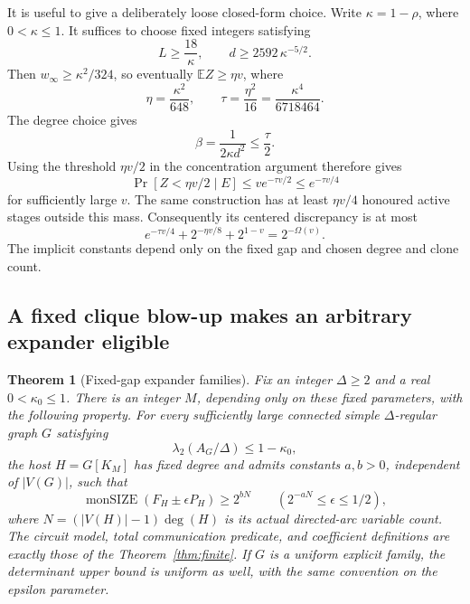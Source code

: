 \documentclass[11pt]{article}
\newtheorem{theorem}{Theorem}[section]
\theoremstyle{definition}
\theoremstyle{remark}
\numberwithin{equation}{section}
\begin{document}
It is useful to give a deliberately loose closed-form choice.
Write \(\kappa=1-\rho\), where \(0<\kappa\le1\). It suffices
to choose fixed integers satisfying
\begin{equation}\label{eq:G3}
L\ge\frac{18}{\kappa},\qquad
              d\ge2592\,\kappa^{-5/2}.
\end{equation}
Then \(w_\infty\ge\kappa^2/324\), so eventually
\(\mathbb E Z\ge\eta v\), where
\[
       \eta=\frac{\kappa^2}{648},\qquad
       \tau=\frac{\eta^2}{16}
            =\frac{\kappa^4}{6718464}.
\]
The degree choice gives
\[
                  \beta=\frac1{2\kappa d^2}\le\frac{\tau}{2}.
\]
Using the threshold \(\eta v/2\) in the concentration argument
therefore gives
\[
 \Pr[Z<\eta v/2\mid E]\le v e^{-\tau v/2}
                                  \le e^{-\tau v/4}
\]
for sufficiently large \(v\). The same construction has at
least \(\eta v/4\) honoured active stages outside this mass.
Consequently its centered discrepancy is at most
\begin{equation}\label{eq:G4}
e^{-\tau v/4}
                     +2^{-\eta v/8}+2^{1-v}
                     =2^{-\Omega(v)}.
\end{equation}
The implicit constants depend only on the fixed gap and
chosen degree and clone count.

\subsection{A fixed clique blow-up makes an arbitrary expander eligible}

\begin{theorem}[Fixed-gap expander families]\label{thm:general} Fix an integer \(\Delta\ge2\) and a real
\(0<\kappa_0\le1\). There is an integer \(M\), depending only
on these fixed parameters, with the following property.
For every sufficiently large connected simple
\(\Delta\)-regular graph \(G\) satisfying
\[
                      \lambda_2(A_G/\Delta)\le1-\kappa_0,
\]
the host \(H=G[K_M]\) has fixed degree and admits constants
\(a,b>0\), independent of \(|V(G)|\), such that
\begin{equation}\label{eq:G5}
\operatorname{monSIZE}(F_H\pm\epsilon P_H)\ge2^{bN}
                \qquad(2^{-aN}\le\epsilon\le1/2),
\end{equation}
where \(N=(|V(H)|-1)\deg(H)\) is its actual directed-arc
variable count. The circuit model, total communication
predicate, and coefficient definitions are exactly those
of the Theorem~\ref{thm:finite}. If \(G\) is a uniform explicit
family, the determinant upper bound is uniform as well,
with the same convention on the epsilon parameter.
\end{theorem}
\end{document}
